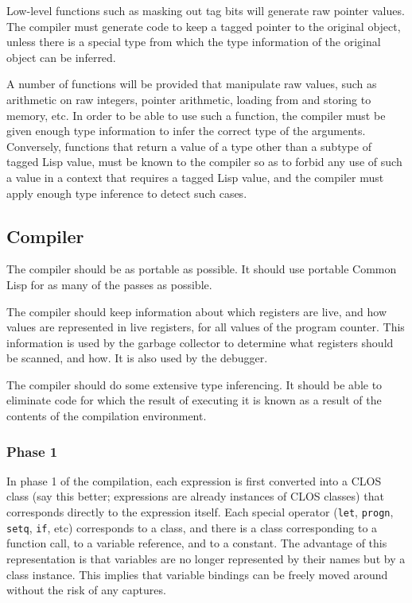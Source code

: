 \documentclass{article}
\begin{document}
Low-level functions such as masking out tag bits will generate raw
pointer values.  The compiler must generate code to keep a tagged
pointer to the original object, unless there is a special type from
which the type information of the original object can be inferred. 

A number of functions will be provided that manipulate raw values,
such as arithmetic on raw integers, pointer arithmetic, loading from
and storing to memory, etc.  In order to be able to use such a
function, the compiler must be given enough type information to infer
the correct type of the arguments.  Conversely, functions that return
a value of a type other than a subtype of tagged Lisp value, must be
known to the compiler so as to forbid any use of such a value in a
context that requires a tagged Lisp value, and the compiler must
apply enough type inference to detect such cases. 

\subsection{Compiler}

The compiler should be as portable as possible.  It should use
portable Common Lisp for as many of the passes as possible.  

The compiler should keep information about which registers are live,
and how values are represented in live registers, for all values of
the program counter.  This information is used by the garbage
collector to determine what registers should be scanned, and how.   It
is also used by the debugger.  

The compiler should do some extensive type inferencing.  It should be
able to eliminate code for which the result of executing it is known
as a result of the contents of the compilation environment.  

\subsubsection{Phase 1}

In phase 1 of the compilation, each expression is first converted into
a CLOS class (say this better; expressions are already instances of
CLOS classes) that corresponds directly to the expression itself.  
Each special operator (\texttt{let}, \texttt{progn}, \texttt{setq},
\texttt{if}, etc) corresponds to a class, and there is a class
corresponding to a function call, to a variable reference, and to a
constant.  The advantage of this representation is that variables are
no longer represented by their names but by a class instance.  This
implies that variable bindings can be freely moved around without the
risk of any captures.  
\end{document}
